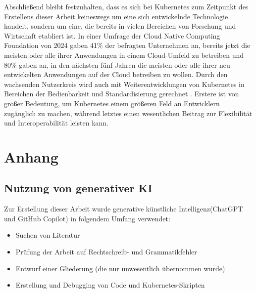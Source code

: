 \documentclass[11pt,a4paper]{article}
\begin{document}
Abschließend bleibt festzuhalten, dass es sich bei Kubernetes zum Zeitpunkt des Erstellens dieser
Arbeit keineswegs um eine sich entwickelnde Technologie handelt, sondern um eine, die bereits
in vielen Bereichen von Forschung und Wirtschaft etabliert ist. In einer Umfrage der 
Cloud Native Computing Foundation von 2024 \cite{cncf} gaben 41\% der befragten Unternehmen an,
bereits jetzt die meisten oder alle ihrer Anwendungen in einem Cloud-Umfeld zu betreiben und
80\% gaben an, in den nächsten fünf Jahren die meisten oder alle ihrer neu entwickelten Anwendungen
auf der Cloud betreiben zu wollen. Durch den wachsenden Nutzerkreis wird auch mit Weiterentwicklungen
von Kubernetes in Bereichen der Bedienbarkeit und Standardisierung gerechnet \cite{emerging_trends}.
Erstere ist von großer Bedeutung, um Kubernetes einem größeren Feld an Entwicklern zugänglich
zu machen, während letztes einen wesentlichen Beitrag zur Flexibilität und Interoperabilität
leisten kann.

\section{Anhang}
\subsection{Nutzung von generativer KI}
Zur Erstellung dieser Arbeit wurde generative künstliche Intelligenz\linebreak (ChatGPT und GitHub Copilot) in folgendem Umfang verwendet:
\begin{itemize}
	\item Suchen von Literatur
	\item Prüfung der Arbeit auf Rechtschreib- und Grammatikfehler
	\item Entwurf einer Gliederung (die nur unwesentlich übernommen wurde)
	\item Erstellung und Debugging von Code und Kubernetes-Skripten
\end{itemize}

% 
% 

\printbibliography
\end{document}
